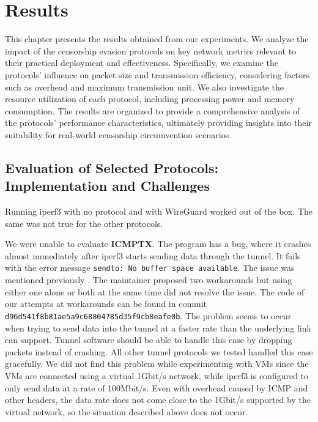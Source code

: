 
\chapter{Results}
\label{chap:results}

This chapter presents the results obtained from our experiments.
We analyze the impact of the censorship evasion protocols on key network metrics relevant to their practical deployment and effectiveness.
Specifically, we examine the protocols' influence on packet size and transmission efficiency, considering factors such as overhead and maximum transmission unit.
We also investigate the resource utilization of each protocol, including processing power and memory consumption.
The results are organized to provide a comprehensive analysis of the protocols' performance characteristics, ultimately providing insights into their suitability for real-world censorship circumvention scenarios.


\section{Evaluation of Selected Protocols: Implementation and Challenges}
Running iperf3 with no protocol and with WireGuard worked out of the box.
The same was not true for the other protocols.

We were unable to evaluate \textbf{ICMPTX}.
The program has a bug, where it crashes almost immediately after iperf3 starts sending data through the tunnel.
It fails with the error message \texttt{sendto: No buffer space available}.
The issue was mentioned previously \cite{icmptx-sendto-no-buffer-space-avaiable}.
The maintainer proposed two workarounds but using either one alone or both at the same time did not resolve the issue.
The code of our attempts at workarounds can be found in commit \texttt{d96d541f8b81ae5a9c68804785d35f9cb8eafe0b}.
The problem seems to occur when trying to send data into the tunnel at a faster rate than the underlying link can support.
Tunnel software should be able to handle this case by dropping packets instead of crashing.
All other tunnel protocols we tested handled this case gracefully.
We did not find this problem while experimenting with VMs since the VMs are connected using a virtual 1Gbit/s network, while iperf3 is configured to only send data at a rate of 100Mbit/s.
Even with overhead caused by ICMP and other headers, the data rate does not come close to the 1Gbit/s supported by the virtual network, so the situation described above does not occur.

